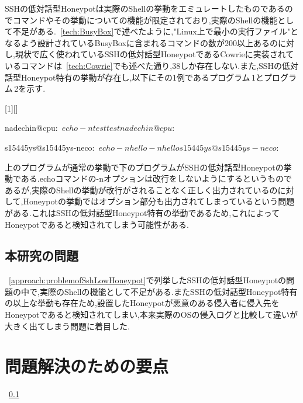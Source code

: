 \label{approach:LowHoneypotCommand}
SSHの低対話型Honeypotは実際のShellの挙動をエミュレートしたものであるのでコマンドやその挙動についての機能が限定されており,実際のShellの機能として不足がある.~\ref{tech:BusyBox}で述べたように,"Linux上で最小の実行ファイル"となるよう設計されているBusyBoxに含まれるコマンドの数が200以上あるのに対し,現状で広く使われているSSHの低対話型HoneypotであるCowrieに実装されているコマンドは~\ref{tech:Cowrie}でも述べた通り,38しか存在しない.また,SSHの低対話型Honeypot特有の挙動が存在し,以下にその1例であるプログラム\,1とプログラム\,2を示す.

\vspace{5mm}
[1][]
    {\lstset{
        frame=single,
        basicstyle=\ttfamily,
        numbers=left,
        numbersep=10pt,
        tabsize=2,
        extendedchars=true,
        xleftmargin=17pt,
        framexleftmargin=17pt,
        #1
    }
}{}

\begin{mylisting}[language=sh,caption=正しいShellの挙動]
nadechin@cpu:~$ echo -n test
testnadechin@cpu:~$
\end{mylisting}

\begin{mylisting}[language=sh,caption=Kippo特有の異常な挙動の例]
s15445ys@s15445ys-neco:~$ echo -n hello
-n hello
s15445ys@s15445ys-neco:~$
\end{mylisting}

上のプログラムが通常の挙動で下のプログラムがSSHの低対話型Honeypotの挙動である.echoコマンドの-nオプションは改行をしないようにするというものであるが,実際のShellの挙動が改行がされることなく正しく出力されているのに対して,Honeypotの挙動ではオプション部分も出力されてしまっているという問題がある.これはSSHの低対話型Honeypot特有の挙動であるため,これによってHoneypotであると検知されてしまう可能性がある.


\subsection{本研究の問題}
\label{approach:subproblem}
~\ref{approach:problemofSshLowHoneypot}で列挙したSSHの低対話型Honeypotの問題の中で,実際のShellの機能として不足がある.またSSHの低対話型Honeypot特有の以上な挙動も存在ため,設置したHoneypotが悪意のある侵入者に侵入先をHoneypotであると検知されてしまい,本来実際のOSの侵入ログと比較して違いが大きく出てしまう問題に着目した.

\section{問題解決のための要点}
\label{approach:YotenForProblem}
~\ref{approach:subproblem}

